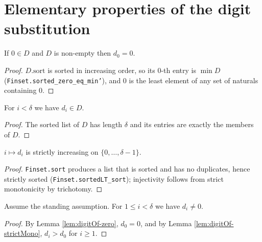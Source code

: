 \section{Elementary properties of the digit substitution}

\begin{lemma}
  \label{lem:digitOf-zero}
  \leanok
  If $0 \in D$ and $D$ is non-empty then $d_0 = 0$.
\end{lemma}
\begin{proof}
  \leanok
  $D.\mathrm{sort}$ is sorted in increasing order, so its $0$-th entry is
  $\min D$ (\texttt{Finset.sorted\_zero\_eq\_min'}), and $0$ is the least
  element of any set of naturals containing $0$.
\end{proof}

\begin{lemma}
  \label{lem:digitOf-mem}
  \leanok
  For $i < \delta$ we have $d_i \in D$.
\end{lemma}
\begin{proof}
  \leanok
  The sorted list of $D$ has length $\delta$ and its entries are exactly the
  members of $D$.
\end{proof}

\begin{lemma}
  \label{lem:digitOf-strictMono}
  \leanok
  $i \mapsto d_i$ is strictly increasing on $\{0, \ldots, \delta - 1\}$.
\end{lemma}
\begin{proof}
  \leanok
  \texttt{Finset.sort} produces a list that is sorted and has no duplicates,
  hence strictly sorted (\texttt{Finset.sortedLT\_sort}); injectivity follows
  from strict monotonicity by trichotomy.
\end{proof}

\begin{lemma}
  \label{lem:digitOf-ne-zero}
  \leanok
  Assume the standing assumption. For $1 \leq i < \delta$ we have $d_i \neq 0$.
\end{lemma}
\begin{proof}
  \leanok
  By Lemma \ref{lem:digitOf-zero}, $d_0 = 0$, and by Lemma
  \ref{lem:digitOf-strictMono}, $d_i > d_0$ for $i \geq 1$.
\end{proof}

